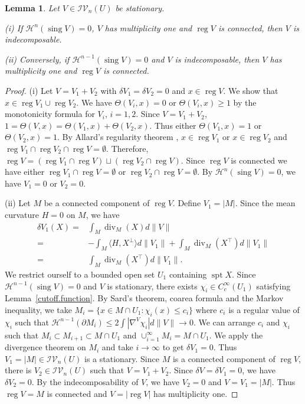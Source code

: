 \documentclass[11pt]{amsart}
\newtheorem{lemma}[theorem]{Lemma}
\theoremstyle{definition}
\newcommand{\HH}{\mathcal{H}}
\newcommand{\IV}{\mathcal{IV}}
\DeclareMathOperator{\spt}{spt}
\DeclareMathOperator{\sing}{sing}
\DeclareMathOperator{\reg}{reg}
\DeclareMathOperator{\Div}{div}
\begin{document}
\begin{lemma}    \label{reg.connected.mult1.equiv.indecomposable}
    Let $V\in \IV_n(U)$ be stationary. 
    
    (i) If $\mathcal{H}^n(\sing V) = 0$, $V$ has multiplicity one and $\reg V$ is connected, then $V$ is indecomposable.  

    (ii) Conversely, if $\mathcal{H}^{n-1}(\sing V) = 0$ and $V$ is indecomposable, then $V$ has multiplicity one and $\reg V$ is connected.

\end{lemma}
\begin{proof}(i) Let $V=V_1+V_2$ with $\delta V_1=\delta V_2=0$ and $x\in \reg V$. We show that $x\in \reg V_1\cup \reg V_2$. We have $\Theta (V_i,x)=0$ or $\Theta (V_i,x)\ge 1$ by the monotonicity formula for $V_i$, $i=1,2$.  Since $V=V_1+V_2$, $1=\Theta(V,x)=\Theta (V_1,x)+\Theta (V_2,x)$. Thus either $\Theta(V_1,x)=1$ or $\Theta(V_2,x)=1$. By Allard's regularity theorem \cite[Theorem 24.2]{Sim}, $x\in \reg V_1$ or $x\in \reg V_2$ and $\reg V_1\cap \reg V_2 \cap \reg V=\emptyset$. Therefore, $\reg V=(\reg V_1\cap \reg V)\sqcup (\reg V_2\cap \reg V)$. Since $\reg V$ is connected we have either $\reg V_1\cap \reg V=\emptyset$ or $\reg V_2\cap \reg V=\emptyset$. By $\HH^{n}(\sing V)=0$, we have $V_1=0$ or $V_2=0$.
    
    (ii) Let $M$ be a connected component of $\reg V$. Define $V_1=|M|$. Since the mean curvature $H=0$ on $M$, we have
    \begin{align*}
        \delta V_1(X)=&\int_M \Div_M (X)d\|V\|\\
        =&-\int_M \langle H,X^\perp\rangle d\|V_1\| +\int _M \Div _M(X^\top)d\|V_1\|\\
        =&\int _M \Div _M(X^\top)d\|V_1\|.
    \end{align*}
    We restrict ourself to a bounded open set $U_1$ containing $\spt X$. Since $\HH^{n-1}(\sing V)=0$ and $V$ is stationary, there exists $\chi_i\in C_c^\infty(U_1)$ satisfying Lemma~\ref{cutoff.function}. By Sard's theorem, coarea formula and the Markov inequality, we take $M_i=\{x\in M\cap U_1:\chi_i(x)\le c_i\}$ where $c_i$ is a regular value of $\chi_i$ such that $\HH^{n-1}(\partial M_i)\le 2\int |\nabla^V\chi_i|d\|V\|\to0$. We can arrange $c_i$ and $\chi_i$ such that $M_i\subset M_{i+1}\subset M\cap U_1$ and $\cup_{i=1}^\infty M_i=M\cap U_1$. We apply the divergence theorem on $M_i$ and take $i\to\infty$ to get $\delta V_1=0$. Thus $V_1=|M|\in \IV_n(U)$ is a stationary. Since $M$ is a connected component of $\reg V$, there is $V_2\in \IV_n(U)$ such that $V=V_1+V_2$. Since $\delta V=\delta V_1=0$, we have $\delta V_2=0$. By the indecomposability of $V$, we have $V_2=0$ and $V=V_1=|M|$. Thus $\reg V=M$ is connected and $V=|\reg V|$ has multiplicity one.
\end{proof}
\end{document}
